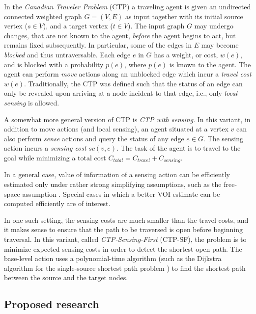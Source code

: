 In the {\em Canadian Traveler Problem} (CTP) \cite{Barnoy.ctp} a
traveling agent is given an undirected connected weighted graph
$G=(V,E)$ as input together with its initial source vertex ($s \in
V$), and a target vertex ($t \in V$).  The input graph $G$ may undergo
changes, that are not known to the agent, {\em before} the agent
begins to act, but remains fixed subsequently.  In particular, some of
the edges in $E$ may become {\em blocked} and thus untraversable. Each
edge $e$ in $G$ has a weight, or cost, $w(e)$, and is blocked with a
probability $p(e)$, where $p(e)$ is known to the agent. The agent can
perform {\em move} actions along an unblocked edge which incur a {\em
  travel cost} $w(e)$.  Traditionally, the CTP was defined such that
the status of an edge can only be revealed upon arriving at a node
incident to that edge, i.e., only {\em local sensing} is allowed.

A somewhat more general version of CTP is {\em CTP with sensing}. In
this variant, in addition to move actions (and local sensing), an
agent situated at a vertex $v$ can also perform {\em sense} actions
and query the status of any edge $e \in G$. The sensing action incurs a
{\em sensing cost} $sc(v,e)$. The task of the agent is to travel to
the goal while minimizing a total cost
$C_{total}=C_{travel}+C_{sensing}$.

In a general case, value of information of a sensing action can be
efficiently estimated only under rather strong simplifying
assumptions, such as the free-space assumption
\cite{Bnaya.sensing}. Special cases in which a better VOI estimate can
be computed efficiently are of interest.

In one such setting, the sensing costs are much smaller than the
travel costs, and it makes sense to ensure that the path to be
traversed is open before beginning traversal.  In this variant, called
{\em CTP-Sensing-First} (CTP-SF), the problem is to minimize expected
sensing costs in order to detect the shortest open path. The
base-level action uses a polynomial-time algorithm (such as the
Dijkstra algorithm for the single-source shortest path problem
\cite{Kleinberg.algorithms}) to find the shortest path between the
source and the target nodes.

\subsection{Proposed research}
\label{sec:app-ctp-research}

